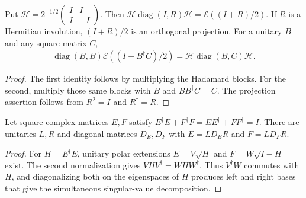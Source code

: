 \begin{lemma}
    \label{thm:mpu_two_sector_cancellation}
    \leanok
    Put $\mathcal H=2^{-1/2}
        \left(\begin{smallmatrix}I&I\\I&-I\end{smallmatrix}\right)$.
    Then $\mathcal H\operatorname{diag}(I,R)\mathcal H
        =\mathcal E((I+R)/2)$.
    If $R$ is a Hermitian involution, $(I+R)/2$ is an orthogonal
    projection. For a unitary $B$ and any square matrix $C$,
    \begin{align}
        \operatorname{diag}(B,B)\mathcal E((I+B^\dagger C)/2)
        =\mathcal H\operatorname{diag}(B,C)\mathcal H.
    \end{align}
\end{lemma}
\begin{proof}\leanok
    The first identity follows by multiplying the Hadamard blocks.
    For the second, multiply those same blocks with $B$ and
    $BB^\dagger C=C$. The projection assertion follows from
    $R^2=I$ and $R^\dagger=R$.
\end{proof}

\begin{lemma}
    \label{lem:mpu_two_operator_svd}
    Let square complex matrices $E,F$ satisfy
    $E^\dagger E+F^\dagger F=EE^\dagger+FF^\dagger=I$.
    There are unitaries $L,R$ and diagonal matrices $D_E,D_F$ with
    $E=LD_ER$ and $F=LD_FR$.
\end{lemma}
\begin{proof}
    For $H=E^\dagger E$, unitary polar extensions
    $E=V\sqrt H$ and $F=W\sqrt{I-H}$ exist.
    The second normalization gives $VHV^\dagger=WHW^\dagger$.
    Thus $V^\dagger W$ commutes with $H$, and diagonalizing both on the
    eigenspaces of $H$ produces left and right bases that give the
    simultaneous singular-value decomposition.
\end{proof}

